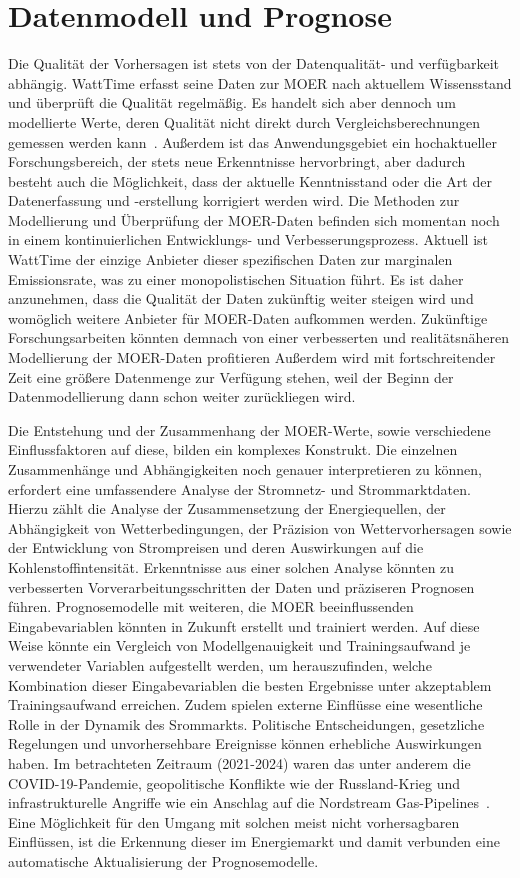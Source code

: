 \section{Datenmodell und Prognose}
Die Qualität der Vorhersagen ist stets von der Datenqualität- und verfügbarkeit abhängig.
WattTime erfasst seine Daten zur \ac{MOER} nach aktuellem Wissensstand und überprüft die Qualität regelmäßig.
Es handelt sich aber dennoch um modellierte Werte, deren Qualität nicht direkt durch Vergleichsberechnungen gemessen werden kann~\cite{WattTime.2022}.
Außerdem ist das Anwendungsgebiet ein hochaktueller Forschungsbereich, der stets neue Erkenntnisse hervorbringt, aber dadurch besteht auch die Möglichkeit, dass der aktuelle Kenntnisstand oder die Art der Datenerfassung und -erstellung korrigiert werden wird.
Die Methoden zur Modellierung und Überprüfung der \ac{MOER}-Daten befinden sich momentan noch in einem kontinuierlichen Entwicklungs- und Verbesserungsprozess.
Aktuell ist WattTime der einzige Anbieter dieser spezifischen Daten zur marginalen Emissionsrate, was zu einer monopolistischen Situation führt.
Es ist daher anzunehmen, dass die Qualität der Daten zukünftig weiter steigen wird und womöglich weitere Anbieter für \ac{MOER}-Daten aufkommen werden.
Zukünftige Forschungsarbeiten könnten demnach von einer verbesserten und realitätsnäheren Modellierung der \ac{MOER}-Daten profitieren
Außerdem wird mit fortschreitender Zeit eine größere Datenmenge zur Verfügung stehen, weil der Beginn der Datenmodellierung dann schon weiter zurückliegen wird.

Die Entstehung und der Zusammenhang der \ac{MOER}-Werte, sowie verschiedene Einflussfaktoren auf diese, bilden ein komplexes Konstrukt.
Die einzelnen Zusammenhänge und Abhängigkeiten noch genauer interpretieren zu können, erfordert eine umfassendere Analyse der Stromnetz- und Strommarktdaten.
Hierzu zählt die Analyse der Zusammensetzung der Energiequellen, der Abhängigkeit von Wetterbedingungen, der Präzision von Wettervorhersagen sowie der Entwicklung von Strompreisen und deren Auswirkungen auf die Kohlenstoffintensität.
Erkenntnisse aus einer solchen Analyse könnten zu verbesserten Vorverarbeitungsschritten der Daten und präziseren Prognosen führen.
Prognosemodelle mit weiteren, die \ac{MOER} beeinflussenden Eingabevariablen könnten in Zukunft erstellt und trainiert werden.
Auf diese Weise könnte ein Vergleich von Modellgenauigkeit und Trainingsaufwand je verwendeter Variablen aufgestellt werden, um herauszufinden, welche Kombination dieser Eingabevariablen die besten Ergebnisse unter akzeptablem Trainingsaufwand erreichen.
Zudem spielen externe Einflüsse eine wesentliche Rolle in der Dynamik des Srommarkts.
Politische Entscheidungen, gesetzliche Regelungen und unvorhersehbare Ereignisse können erhebliche Auswirkungen haben.
Im betrachteten Zeitraum (2021-2024) waren das unter anderem die COVID-19-Pandemie, geopolitische Konflikte wie der Russland-Krieg und infrastrukturelle Angriffe wie ein Anschlag auf die Nordstream Gas-Pipelines~\cite{Baumgartner.30.09.2022}.
Eine Möglichkeit für den Umgang mit solchen meist nicht vorhersagbaren Einflüssen, ist die Erkennung dieser im Energiemarkt und damit verbunden eine automatische Aktualisierung der Prognosemodelle.

